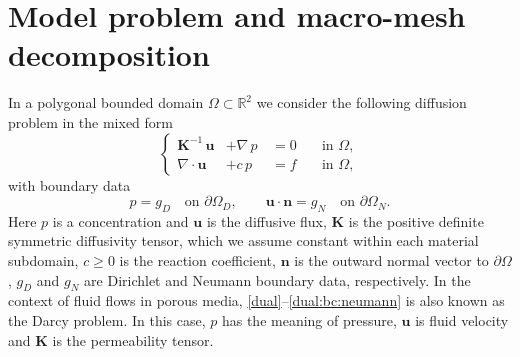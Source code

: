\documentclass[12pt]{article}
\newcommand{\vect}[1]{\boldsymbol{\mathbf{#1}}}
\newcommand{\Rn}[1]{{\mathbb R^{#1}}}
\begin{document}
\section{Model problem and macro-mesh decomposition} \label{sec:model}
In a polygonal bounded domain $\Omega \subset \Rn{2}$  we consider the following diffusion problem in the mixed form
	\begin{equation}\label{dual}
		\left\{\begin{split}
			\vect K^{-1}\,\vect u &+ \nabla\,p\,&= 0&\quad\text{in } \Omega , \\
			\nabla\cdot\vect u    &+ c\,p       &= f&\quad\text{in } \Omega,
		\end{split}\right.
\end{equation}
with boundary data
		\begin{equation}
			p = g_D \quad\text{on } \partial\Omega_D,\qquad %
			\vect u \cdot {\vect n} = g_N \quad\text{on } \partial\Omega_N. \label{dual:bc:neumann}
		\end{equation}
Here $p$ is a concentration and $\vect u$ is the diffusive flux, $\vect K$ is the positive definite  symmetric diffusivity tensor, which we assume constant within each material subdomain, $c\ge0$ is the reaction coefficient, $\vect n$ is the outward normal vector to $\partial\Omega$, $g_D$ and $g_N$ are Dirichlet and Neumann boundary data, respectively. In the context of fluid flows in porous media, \eqref{dual}--\eqref{dual:bc:neumann} is also known as the Darcy problem. In this case, $p$ has the meaning of pressure, $\vect u$ is fluid velocity and $\vect K$ is the permeability tensor.
\end{document}
